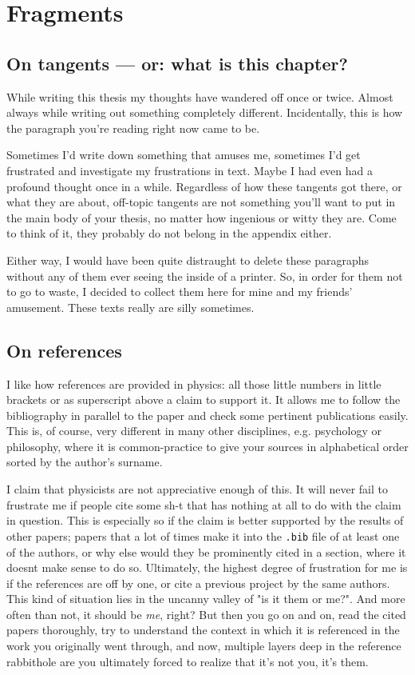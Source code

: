 \chapter{Fragments}
\label{ch:fragments}

\section*{On tangents --- or: what is this chapter?}
While writing this thesis my thoughts have wandered off once or twice. Almost
always while writing out something completely different. Incidentally, this is
how the paragraph you're reading right now came to be.

Sometimes I'd write down something that amuses me, sometimes I'd get frustrated
and investigate my frustrations in text. Maybe I had even had a profound
thought once in a while.  Regardless of how these tangents got there, or what
they are about, off-topic tangents are not something you'll want to put in the
main body of your thesis, no matter how ingenious or witty they are.  Come to
think of it, they probably do not belong in the appendix either.

Either way, I would have been quite distraught to delete these paragraphs
without any of them ever seeing the inside of a printer. So, in order for them
not to go to waste, I decided to collect them here for mine and my friends'
amusement. These texts really are silly sometimes.

\section*{On references}
I like how references are provided in physics: all those little numbers in
little brackets or as superscript above a claim to support it. It allows me to
follow the bibliography in parallel to the paper and check some pertinent
publications easily. This is, of course, very different in many other
disciplines, e.g. psychology or philosophy, where it is common-practice to give
your sources in alphabetical order sorted by the author's surname.

I claim that physicists are not appreciative enough of this. It will never fail
to frustrate me if people cite some sh-t that has nothing at all to do with the
claim in question. This is especially so if the claim is better supported by
the results of other papers; papers that a lot of times make it into the
\texttt{.bib} file of at least one of the authors, or why else would they be
prominently cited in a section, where it doesnt make sense to do so.
Ultimately, the highest degree of frustration for me is if the references are
off by one, or cite a previous project by the same authors. This kind of
situation lies in the uncanny valley of "is it them or me?". And more often
than not, it should be \emph{me}, right? But then you go on and on, read the
cited papers thoroughly, try to understand the context in which it is
referenced in the work you originally went through, and now, multiple layers
deep in the reference rabbithole are you ultimately forced to realize that it's
not you, it's them. 

